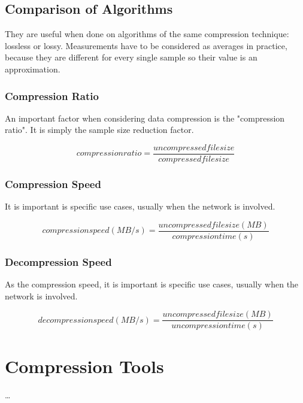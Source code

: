 \documentclass[12pt, a4paper]{report}
\begin{document}
\section{Comparison of Algorithms}

They are useful when done on algorithms of the same compression technique: lossless or lossy.
Measurements have to be considered as averages in practice, because they are different for every single sample so their value is
an approximation.

\subsection{Compression Ratio}

An important factor when considering data compression is the "compression ratio". It is simply the sample size reduction factor.

\begin{equation} \label{eq:entropy_bounds}
  compression ratio = \frac{uncompressed file size}{compressed file size}
\end{equation}

\subsection{Compression Speed}

It is important is specific use cases, usually when the network is involved.

\begin{equation} \label{eq:entropy_bounds}
  compression speed (MB / s) = \frac{uncompressed file size (MB)}{compression time (s)}
\end{equation}

\subsection{Decompression Speed}

As the compression speed, it is important is specific use cases, usually when the network is involved.

\begin{equation} \label{eq:entropy_bounds}
  decompression speed (MB / s) = \frac{uncompressed file size (MB)}{uncompression time (s)}
\end{equation}

\chapter{Compression Tools}

\dots

\appendix

\printbibliography
\end{document}
